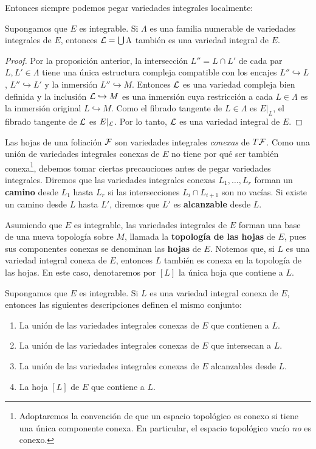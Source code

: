 Entonces siempre podemos pegar variedades integrales localmente:

\begin{corollary}
Supongamos que $E$ es integrable. Si $\Lambda$ es una familia numerable de variedades integrales de $E$, entonces $\mathcal L = \bigcup \Lambda$ también es una variedad integral de $E$.
\end{corollary}

\begin{proof}
Por la proposición anterior, la intersección $L'' = L \cap L'$ de cada par $L, L' \in \Lambda$ tiene una única estructura compleja compatible con los encajes $L'' \hookrightarrow L$, $L'' \hookrightarrow L'$ y la inmersión $L'' \hookrightarrow M$. Entonces $\mathcal L$ es una variedad compleja bien definida y la inclusión $\mathcal L \hookrightarrow M$ es una inmersión cuya restricción a cada $L \in \Lambda$ es la inmersión original $L \hookrightarrow M$. Como el fibrado tangente de $L \in \Lambda$ es $E \vert_L$, el fibrado tangente de $\mathcal L$ es $E \vert_\mathcal L$. Por lo tanto, $\mathcal L$ es una variedad integral de $E$.
\end{proof}

Las hojas de una foliación $\mathcal F$ son variedades integrales \textit{conexas} de $T\mathcal F$. Como una unión de variedades integrales conexas de $E$ no tiene por qué ser también conexa\footnote{Adoptaremos la convención de que un espacio topológico es conexo si tiene una única componente conexa. En particular, el espacio topológico vacío \textit{no} es conexo.}, debemos tomar ciertas precauciones antes de pegar variedades integrales. Diremos que las variedades integrales conexas $L_1, \dots, L_r$ forman un \textbf{camino} desde $L_1$ hasta $L_r$ si las intersecciones $L_i \cap L_{i+1}$ son no vacías. Si existe un camino desde $L$ hasta $L'$, diremos que $L'$ es \textbf{alcanzable} desde $L$.

Asumiendo que $E$ es integrable, las variedades integrales de $E$ forman una base de una nueva topología sobre $M$, llamada la \textbf{topología de las hojas} de $E$, pues sus componentes conexas se denominan las \textbf{hojas} de $E$. Notemos que, si $L$ es una variedad integral conexa de $E$, entonces $L$ también es conexa en la topología de las hojas. En este caso, denotaremos por $[L]$ la única hoja que contiene a $L$.

\begin{proposition}
Supongamos que $E$ es integrable. Si $L$ es una variedad integral conexa de $E$, entonces las siguientes descripciones definen el mismo conjunto:
\begin{enumerate}[label=\alph*)]
    \itemsep 0em
    \item La unión de las variedades integrales conexas de $E$ que contienen a $L$.
    \item La unión de las variedades integrales conexas de $E$ que intersecan a $L$.
    \item La unión de las variedades integrales conexas de $E$ alcanzables desde $L$.
    \item La hoja $[L]$ de $E$ que contiene a $L$.
\end{enumerate}
\end{proposition}


